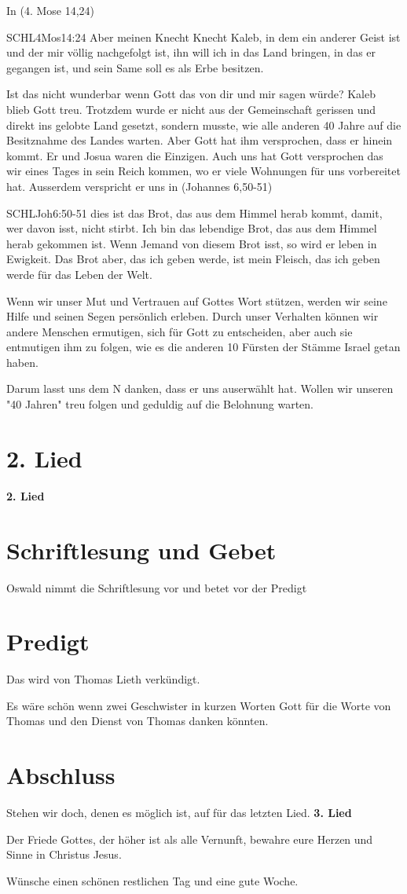 In (4. Mose 14,24)
\begin{bibelbox}{SCHL}{4Mos}{14:24}
Aber meinen Knecht Knecht Kaleb, in dem ein anderer Geist ist und der mir völlig nachgefolgt ist, ihn will ich in das Land bringen, in das er gegangen ist, und sein Same soll es als Erbe besitzen.
\end{bibelbox}
Ist das nicht wunderbar wenn Gott das von dir und mir sagen würde? Kaleb blieb Gott treu. Trotzdem wurde er nicht aus der Gemeinschaft gerissen und direkt ins gelobte Land gesetzt, sondern musste, wie alle anderen 40 Jahre auf die Besitznahme des Landes warten. Aber Gott hat ihm versprochen, dass er hinein kommt. Er und Josua waren die Einzigen. 
Auch uns hat Gott versprochen das wir eines Tages in sein Reich kommen, wo er viele Wohnungen für uns vorbereitet hat. Ausserdem verspricht er uns in (Johannes 6,50-51)
\begin{bibelbox}{SCHL}{Joh}{6:50-51}
dies ist das Brot, das aus dem Himmel herab kommt, damit, wer davon isst, nicht stirbt. Ich bin das lebendige Brot, das aus dem Himmel herab gekommen ist. Wenn Jemand von diesem Brot isst, so wird er leben in Ewigkeit. Das Brot aber, das ich geben werde, ist mein Fleisch, das ich geben werde für das Leben der Welt.
\end{bibelbox}
Wenn wir unser Mut und Vertrauen auf Gottes Wort stützen, werden wir seine Hilfe und seinen Segen persönlich erleben. Durch unser Verhalten können wir andere Menschen ermutigen, sich für Gott zu entscheiden, aber auch sie entmutigen ihm zu folgen, wie es die anderen 10 Fürsten der Stämme Israel getan haben.

Darum lasst uns dem \herr N danken, dass er uns auserwählt hat. Wollen wir unseren "40 Jahren" treu folgen und geduldig auf die Belohnung warten.

\section{2. Lied}

\textbf{2. Lied}

\section{Schriftlesung und Gebet}
Oswald nimmt die Schriftlesung vor und betet vor der Predigt

\section{Predigt}
Das wird von Thomas Lieth verkündigt.

Es wäre schön wenn zwei Geschwister in kurzen Worten Gott für die Worte von Thomas und den Dienst von Thomas danken könnten.

\section{Abschluss}
Stehen wir doch, denen es möglich ist, auf für das letzten Lied.
\textbf{3. Lied}

Der Friede Gottes, der höher ist als alle Vernunft,
bewahre eure Herzen und Sinne in Christus Jesus.

Wünsche einen schönen restlichen Tag und eine gute Woche.
